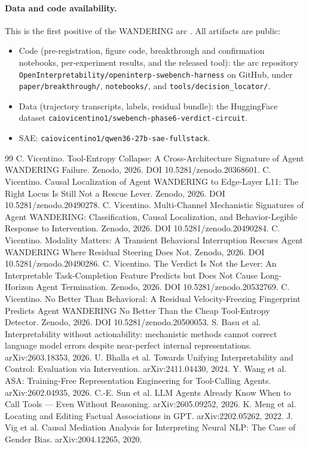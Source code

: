 \documentclass[11pt]{article}
\begin{document}
\paragraph{Data and code availability.} This is the first positive of the WANDERING arc \cite{tool_entropy,residual_nulls,multichannel,modality,verdict_circuit,companion_note}. All artifacts are public:
\begin{itemize}\itemsep1pt
\item Code (pre-registration, figure code, breakthrough and confirmation notebooks, per-experiment results, and the released tool): the arc repository \texttt{OpenInterpretability/openinterp-swebench-harness} on GitHub, under \texttt{paper/breakthrough/}, \texttt{notebooks/}, and \texttt{tools/decision\_locator/}.
\item Data (trajectory transcripts, labels, residual bundle): the HuggingFace dataset \texttt{caiovicentino1/swebench-phase6-verdict-circuit}.
\item SAE: \texttt{caiovicentino1/qwen36-27b-sae-fullstack}.
\end{itemize}

\begin{thebibliography}{99}
 C. Vicentino. Tool-Entropy Collapse: A Cross-Architecture Signature of Agent WANDERING Failure. Zenodo, 2026. DOI 10.5281/zenodo.20368601.
 C. Vicentino. Causal Localization of Agent WANDERING to Edge-Layer L11: The Right Locus Is Still Not a Rescue Lever. Zenodo, 2026. DOI 10.5281/zenodo.20490278.
 C. Vicentino. Multi-Channel Mechanistic Signatures of Agent WANDERING: Classification, Causal Localization, and Behavior-Legible Response to Intervention. Zenodo, 2026. DOI 10.5281/zenodo.20490284.
 C. Vicentino. Modality Matters: A Transient Behavioral Interruption Rescues Agent WANDERING Where Residual Steering Does Not. Zenodo, 2026. DOI 10.5281/zenodo.20490286.
 C. Vicentino. The Verdict Is Not the Lever: An Interpretable Task-Completion Feature Predicts but Does Not Cause Long-Horizon Agent Termination. Zenodo, 2026. DOI 10.5281/zenodo.20532769.
 C. Vicentino. No Better Than Behavioral: A Residual Velocity-Freezing Fingerprint Predicts Agent WANDERING No Better Than the Cheap Tool-Entropy Detector. Zenodo, 2026. DOI 10.5281/zenodo.20500053.
 S. Basu et al. Interpretability without actionability: mechanistic methods cannot correct language model errors despite near-perfect internal representations. arXiv:2603.18353, 2026.
 U. Bhalla et al. Towards Unifying Interpretability and Control: Evaluation via Intervention. arXiv:2411.04430, 2024.
 Y. Wang et al. ASA: Training-Free Representation Engineering for Tool-Calling Agents. arXiv:2602.04935, 2026.
 C.-E. Sun et al. LLM Agents Already Know When to Call Tools --- Even Without Reasoning. arXiv:2605.09252, 2026.
 K. Meng et al. Locating and Editing Factual Associations in GPT. arXiv:2202.05262, 2022.
 J. Vig et al. Causal Mediation Analysis for Interpreting Neural NLP: The Case of Gender Bias. arXiv:2004.12265, 2020.
\end{thebibliography}
\end{document}
